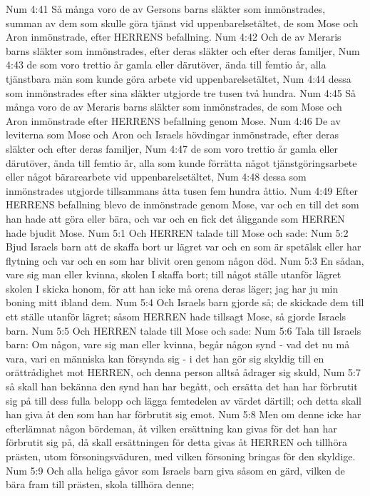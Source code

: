 Num 4:41  Så många voro de av Gersons barns släkter som inmönstrades, summan av dem som skulle göra tjänst vid uppenbarelsetältet, de som Mose och Aron inmönstrade, efter HERRENS befallning.
Num 4:42  Och de av Meraris barns släkter som inmönstrades, efter deras släkter och efter deras familjer,
Num 4:43  de som voro trettio år gamla eller därutöver, ända till femtio år, alla tjänstbara män som kunde göra arbete vid uppenbarelsetältet,
Num 4:44  dessa som inmönstrades efter sina släkter utgjorde tre tusen två hundra.
Num 4:45  Så många voro de av Meraris barns släkter som inmönstrades, de som Mose och Aron inmönstrade efter HERRENS befallning genom Mose.
Num 4:46  De av leviterna som Mose och Aron och Israels hövdingar inmönstrade, efter deras släkter och efter deras familjer,
Num 4:47  de som voro trettio år gamla eller därutöver, ända till femtio år, alla som kunde förrätta något tjänstgöringsarbete eller något bärarearbete vid uppenbarelsetältet,
Num 4:48  dessa som inmönstrades utgjorde tillsammans åtta tusen fem hundra åttio.
Num 4:49  Efter HERRENS befallning blevo de inmönstrade genom Mose, var och en till det som han hade att göra eller bära, och var och en fick det åliggande som HERREN hade bjudit Mose.
Num 5:1  Och HERREN talade till Mose och sade:
Num 5:2  Bjud Israels barn att de skaffa bort ur lägret var och en som är spetälsk eller har flytning och var och en som har blivit oren genom någon död.
Num 5:3  En sådan, vare sig man eller kvinna, skolen I skaffa bort; till något ställe utanför lägret skolen I skicka honom, för att han icke må orena deras läger; jag har ju min boning mitt ibland dem.
Num 5:4  Och Israels barn gjorde så; de skickade dem till ett ställe utanför lägret; såsom HERREN hade tillsagt Mose, så gjorde Israels barn.
Num 5:5  Och HERREN talade till Mose och sade:
Num 5:6  Tala till Israels barn: Om någon, vare sig man eller kvinna, begår någon synd - vad det nu må vara, vari en människa kan försynda sig - i det han gör sig skyldig till en orättrådighet mot HERREN, och denna person alltså ådrager sig skuld,
Num 5:7  så skall han bekänna den synd han har begått, och ersätta det han har förbrutit sig på till dess fulla belopp och lägga femtedelen av värdet därtill; och detta skall han giva åt den som han har förbrutit sig emot.
Num 5:8  Men om denne icke har efterlämnat någon bördeman, åt vilken ersättning kan givas för det han har förbrutit sig på, då skall ersättningen för detta givas åt HERREN och tillhöra prästen, utom försoningsväduren, med vilken försoning bringas för den skyldige.
Num 5:9  Och alla heliga gåvor som Israels barn giva såsom en gärd, vilken de bära fram till prästen, skola tillhöra denne;
